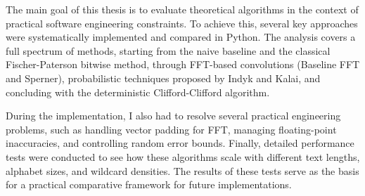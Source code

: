 The main goal of this thesis is to evaluate theoretical algorithms in the context of practical software engineering constraints. To achieve this, several key approaches were systematically implemented and compared in Python. The analysis covers a full spectrum of methods, starting from the naive baseline and the classical Fischer-Paterson bitwise method, through FFT-based convolutions (Baseline FFT and Sperner), probabilistic techniques proposed by Indyk and Kalai, and concluding with the deterministic Clifford-Clifford algorithm.

During the implementation, I also had to resolve several practical engineering problems, such as handling vector padding for FFT, managing floating-point inaccuracies, and controlling random error bounds. Finally, detailed performance tests were conducted to see how these algorithms scale with different text lengths, alphabet sizes, and wildcard densities. The results of these tests serve as the basis for a practical comparative framework for future implementations.